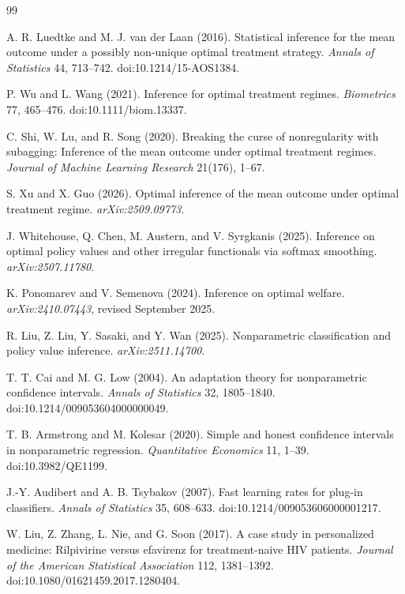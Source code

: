 \documentclass{article}
\begin{document}
\begin{thebibliography}{99}

   A. R. Luedtke and M. J. van der Laan (2016). Statistical inference for the mean outcome under a possibly non-unique optimal treatment strategy. \textit{Annals of Statistics} 44, 713--742. doi:10.1214/15-AOS1384.

   P. Wu and L. Wang (2021). Inference for optimal treatment regimes. \textit{Biometrics} 77, 465--476. doi:10.1111/biom.13337.

   C. Shi, W. Lu, and R. Song (2020). Breaking the curse of nonregularity with subagging: Inference of the mean outcome under optimal treatment regimes. \textit{Journal of Machine Learning Research} 21(176), 1--67.

   S. Xu and X. Guo (2026). Optimal inference of the mean outcome under optimal treatment regime. \textit{arXiv:2509.09773}.

   J. Whitehouse, Q. Chen, M. Austern, and V. Syrgkanis (2025). Inference on optimal policy values and other irregular functionals via softmax smoothing. \textit{arXiv:2507.11780}.

   K. Ponomarev and V. Semenova (2024). Inference on optimal welfare. \textit{arXiv:2410.07443}, revised September 2025.

   R. Liu, Z. Liu, Y. Sasaki, and Y. Wan (2025). Nonparametric classification and policy value inference. \textit{arXiv:2511.14700}.

   T. T. Cai and M. G. Low (2004). An adaptation theory for nonparametric confidence intervals. \textit{Annals of Statistics} 32, 1805--1840. doi:10.1214/009053604000000049.

   T. B. Armstrong and M. Kolesar (2020). Simple and honest confidence intervals in nonparametric regression. \textit{Quantitative Economics} 11, 1--39. doi:10.3982/QE1199.

   J.-Y. Audibert and A. B. Tsybakov (2007). Fast learning rates for plug-in classifiers. \textit{Annals of Statistics} 35, 608--633. doi:10.1214/009053606000001217.

   W. Liu, Z. Zhang, L. Nie, and G. Soon (2017). A case study in personalized medicine: Rilpivirine versus efavirenz for treatment-naive HIV patients. \textit{Journal of the American Statistical Association} 112, 1381--1392. doi:10.1080/01621459.2017.1280404.

\end{thebibliography}
\end{document}
